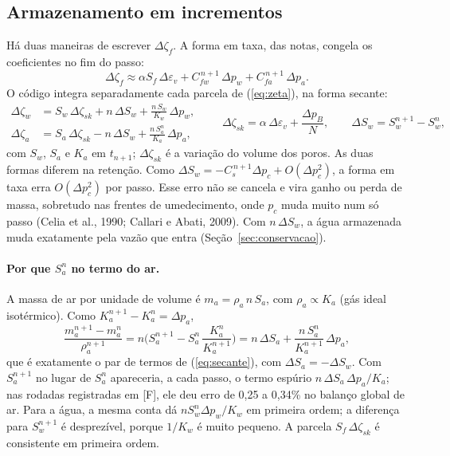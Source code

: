 \documentclass[11pt,a4paper]{article}
\begin{document}
\subsection{Armazenamento em incrementos}
Há duas maneiras de escrever $\Delta\zeta_f$. A forma em taxa, das notas, congela os
coeficientes no fim do passo:
\begin{equation}
\Delta\zeta_f\approx\alpha S_f\,\Delta\varepsilon_v+C_{fw}^{\,n+1}\,\Delta p_w
+C_{fa}^{\,n+1}\,\Delta p_a .
\label{eq:taxa}
\end{equation}
O código integra separadamente cada parcela de (\ref{eq:zeta}), na forma secante:
\begin{equation}
\begin{aligned}
\Delta\zeta_w&=S_w\,\Delta\zeta_{sk}+n\,\Delta S_w+\frac{n\,S_w}{K_w}\,\Delta p_w,\\
\Delta\zeta_a&=S_a\,\Delta\zeta_{sk}-n\,\Delta S_w+\frac{n\,S_a^{n}}{K_a}\,\Delta p_a,
\end{aligned}
\qquad
\Delta\zeta_{sk}=\alpha\,\Delta\varepsilon_v+\frac{\Delta p_B}{N},\qquad
\Delta S_w=S_w^{n+1}-S_w^{n},
\label{eq:secante}
\end{equation}
com $S_w$, $S_a$ e $K_a$ em $t_{n+1}$; $\Delta\zeta_{sk}$ é a variação do volume dos poros.
As duas formas diferem na retenção. Como $\Delta S_w=-C_s^{\,n+1}\Delta p_c+O(\Delta p_c^2)$,
a forma em taxa erra $O(\Delta p_c^2)$ por passo. Esse erro não se cancela e vira ganho ou
perda de massa, sobretudo nas frentes de umedecimento, onde $p_c$ muda muito num só passo
(Celia et al., 1990; Callari e Abati, 2009). Com $n\,\Delta S_w$, a água armazenada muda
exatamente pela vazão que entra (Seção~\ref{sec:conservacao}).

\paragraph{\texorpdfstring{Por que $S_a^n$ no termo do ar.}{Por que Sa(n) no termo do ar.}}
A massa de ar por unidade de volume é $m_a=\rho_a\,n\,S_a$, com $\rho_a\propto K_a$ (gás
ideal isotérmico). Como $K_a^{n+1}-K_a^{n}=\Delta p_a$,
\begin{equation}
\frac{m_a^{n+1}-m_a^{n}}{\rho_a^{n+1}}
=n\Big(S_a^{n+1}-S_a^{n}\,\frac{K_a^{n}}{K_a^{n+1}}\Big)
=n\,\Delta S_a+\frac{n\,S_a^{n}}{K_a^{n+1}}\,\Delta p_a ,
\label{eq:arexato}
\end{equation}
que é exatamente o par de termos de (\ref{eq:secante}), com $\Delta S_a=-\Delta S_w$. Com
$S_a^{n+1}$ no lugar de $S_a^{n}$ apareceria, a cada passo, o termo espúrio
$n\,\Delta S_a\,\Delta p_a/K_a$; nas rodadas registradas em [F], ele deu erro de 0,25 a
0,34\% no balanço global de ar. Para a água, a mesma conta dá $nS_w^n\Delta p_w/K_w$ em
primeira ordem; a diferença para $S_w^{n+1}$ é desprezível, porque $1/K_w$ é muito pequeno.
A parcela $S_f\,\Delta\zeta_{sk}$ é consistente em primeira ordem.
\end{document}
